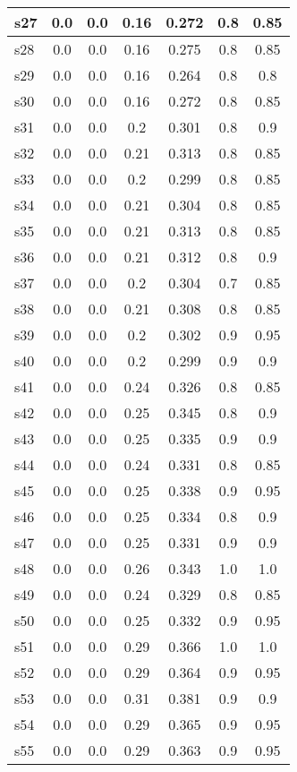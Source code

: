 \documentclass{article}
\begin{document}
\begin{tabular}{|l|c|c|c|c|c|c|}
\hline
s27 &0.0 & 0.0 & 0.16 & 0.272 & 0.8 & 0.85\\
\hline
s28 &0.0 & 0.0 & 0.16 & 0.275 & 0.8 & 0.85\\
\hline
s29 &0.0 & 0.0 & 0.16 & 0.264 & 0.8 & 0.8\\
\hline
s30 &0.0 & 0.0 & 0.16 & 0.272 & 0.8 & 0.85\\
\hline
s31 &0.0 & 0.0 & 0.2 & 0.301 & 0.8 & 0.9\\
\hline
s32 &0.0 & 0.0 & 0.21 & 0.313 & 0.8 & 0.85\\
\hline
s33 &0.0 & 0.0 & 0.2 & 0.299 & 0.8 & 0.85\\
\hline
s34 &0.0 & 0.0 & 0.21 & 0.304 & 0.8 & 0.85\\
\hline
s35 &0.0 & 0.0 & 0.21 & 0.313 & 0.8 & 0.85\\
\hline
s36 &0.0 & 0.0 & 0.21 & 0.312 & 0.8 & 0.9\\
\hline
s37 &0.0 & 0.0 & 0.2 & 0.304 & 0.7 & 0.85\\
\hline
s38 &0.0 & 0.0 & 0.21 & 0.308 & 0.8 & 0.85\\
\hline
s39 &0.0 & 0.0 & 0.2 & 0.302 & 0.9 & 0.95\\
\hline
s40 &0.0 & 0.0 & 0.2 & 0.299 & 0.9 & 0.9\\
\hline
s41 &0.0 & 0.0 & 0.24 & 0.326 & 0.8 & 0.85\\
\hline
s42 &0.0 & 0.0 & 0.25 & 0.345 & 0.8 & 0.9\\
\hline
s43 &0.0 & 0.0 & 0.25 & 0.335 & 0.9 & 0.9\\
\hline
s44 &0.0 & 0.0 & 0.24 & 0.331 & 0.8 & 0.85\\
\hline
s45 &0.0 & 0.0 & 0.25 & 0.338 & 0.9 & 0.95\\
\hline
s46 &0.0 & 0.0 & 0.25 & 0.334 & 0.8 & 0.9\\
\hline
s47 &0.0 & 0.0 & 0.25 & 0.331 & 0.9 & 0.9\\
\hline
s48 &0.0 & 0.0 & 0.26 & 0.343 & 1.0 & 1.0\\
\hline
s49 &0.0 & 0.0 & 0.24 & 0.329 & 0.8 & 0.85\\
\hline
s50 &0.0 & 0.0 & 0.25 & 0.332 & 0.9 & 0.95\\
\hline
s51 &0.0 & 0.0 & 0.29 & 0.366 & 1.0 & 1.0\\
\hline
s52 &0.0 & 0.0 & 0.29 & 0.364 & 0.9 & 0.95\\
\hline
s53 &0.0 & 0.0 & 0.31 & 0.381 & 0.9 & 0.9\\
\hline
s54 &0.0 & 0.0 & 0.29 & 0.365 & 0.9 & 0.95\\
\hline
s55 &0.0 & 0.0 & 0.29 & 0.363 & 0.9 & 0.95\\

\end{tabular}
\end{document}
